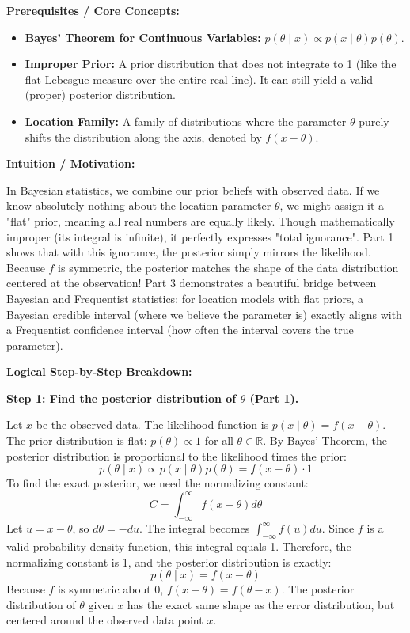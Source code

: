 \begin{solution}
\textbf{Prerequisites / Core Concepts:}
\begin{itemize}
    \item \textbf{Bayes' Theorem for Continuous Variables:} $p(\theta \mid x) \propto p(x \mid \theta) p(\theta)$.
    \item \textbf{Improper Prior:} A prior distribution that does not integrate to 1 (like the flat Lebesgue measure over the entire real line). It can still yield a valid (proper) posterior distribution.
    \item \textbf{Location Family:} A family of distributions where the parameter $\theta$ purely shifts the distribution along the axis, denoted by $f(x-\theta)$.
\end{itemize}

\textbf{Intuition / Motivation:}

In Bayesian statistics, we combine our prior beliefs with observed data. If we know absolutely nothing about the location parameter $\theta$, we might assign it a "flat" prior, meaning all real numbers are equally likely. Though mathematically improper (its integral is infinite), it perfectly expresses "total ignorance". 
Part 1 shows that with this ignorance, the posterior simply mirrors the likelihood. Because $f$ is symmetric, the posterior matches the shape of the data distribution centered at the observation!
Part 3 demonstrates a beautiful bridge between Bayesian and Frequentist statistics: for location models with flat priors, a Bayesian credible interval (where we believe the parameter is) exactly aligns with a Frequentist confidence interval (how often the interval covers the true parameter).

\textbf{Logical Step-by-Step Breakdown:}

\textbf{Step 1: Find the posterior distribution of $\theta$ (Part 1).}

Let $x$ be the observed data. The likelihood function is $p(x \mid \theta) = f(x-\theta)$.
The prior distribution is flat: $p(\theta) \propto 1$ for all $\theta \in \mathbb{R}$.
By Bayes' Theorem, the posterior distribution is proportional to the likelihood times the prior:
\[ p(\theta \mid x) \propto p(x \mid \theta) p(\theta) = f(x-\theta) \cdot 1 \]
To find the exact posterior, we need the normalizing constant:
\[ C = \int_{-\infty}^\infty f(x-\theta) d\theta \]
Let $u = x-\theta$, so $d\theta = -du$. The integral becomes $\int_{-\infty}^\infty f(u) du$. 
Since $f$ is a valid probability density function, this integral equals 1.
Therefore, the normalizing constant is 1, and the posterior distribution is exactly:
\[ p(\theta \mid x) = f(x-\theta) \]
Because $f$ is symmetric about 0, $f(x-\theta) = f(\theta-x)$. The posterior distribution of $\theta$ given $x$ has the exact same shape as the error distribution, but centered around the observed data point $x$.


\end{solution}
